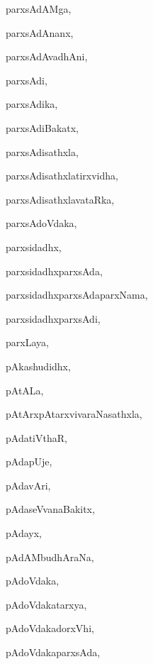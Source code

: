 \begin{multicols}{3}
{\noindent
{parxsAdAMga}, \pageref{parxsAdAMga}

\noindent
{parxsAdAnanx}, \pageref{parxsAdAnanx}

\noindent
{parxsAdAvadhAni}, \pageref{parxsAdAvadhAni}

\noindent
{parxsAdi}, \pageref{parxsAdi}

\noindent
{parxsAdika}, \pageref{parxsAdika}

\noindent
{parxsAdiBakatx}, \pageref{parxsAdiBakatx}

\noindent
{parxsAdisathxla}, \pageref{parxsAdisathxla}

\noindent
{parxsAdisathxlatirxvidha}, \pageref{parxsAdisathxlatirxvidha}

\noindent
{parxsAdisathxlavataRka}, \pageref{parxsAdisathxlavataRka}

\noindent
{parxsAdoVdaka}, \pageref{parxsAdoVdaka}

\noindent
{parxsidadhx}, \pageref{parxsidadhx}

\noindent
{parxsidadhxparxsAda}, \pageref{parxsidadhxparxsAda}

\noindent
{parxsidadhxparxsAdaparxNama}, \pageref{parxsidadhxparxsAdaparxNama}

\noindent
{parxsidadhxparxsAdi}, \pageref{parxsidadhxparxsAdi}

\noindent
{parxLaya}, \pageref{parxLaya}

\noindent
{pAkashudidhx}, \pageref{pAkashudidhx}

\noindent
{pAtALa}, \pageref{pAtALa}

\noindent
{pAtArxpAtarxvivaraNasathxla}, \pageref{pAtArxpAtarxvivaraNasathxla}

\noindent
{pAdatiVthaR}, \pageref{pAdatiVthaR}

\noindent
{pAdapUje}, \pageref{pAdapUje}

\noindent
{pAdavAri}, \pageref{pAdavAri}

\noindent
{pAdaseVvanaBakitx}, \pageref{pAdaseVvanaBakitx}

\noindent
{pAdayx}, \pageref{pAdayx}

\noindent
{pAdAMbudhAraNa}, \pageref{pAdAMbudhAraNa}

\noindent
{pAdoVdaka}, \pageref{pAdoVdaka}

\noindent
{pAdoVdakatarxya}, \pageref{pAdoVdakatarxya}

\noindent
{pAdoVdakadorxVhi}, \pageref{pAdoVdakadorxVhi}

\noindent
{pAdoVdakaparxsAda}, \pageref{pAdoVdakaparxsAda}

}
\end{multicols}
